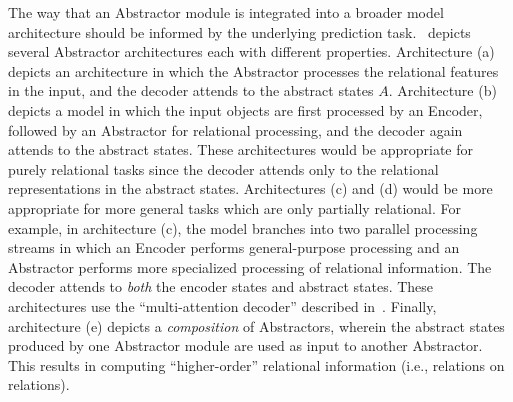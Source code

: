 The way that an Abstractor module is integrated into a broader model architecture should be informed by the underlying prediction task.~ depicts several Abstractor architectures each with different properties. Architecture (a) depicts an architecture in which the Abstractor processes the relational features in the input, and the decoder attends to the abstract states $A$. Architecture (b) depicts a model in which the input objects are first processed by an Encoder, followed by an Abstractor for relational processing, and the decoder again attends to the abstract states. These architectures would be appropriate for purely relational tasks since the decoder attends only to the relational representations in the abstract states. Architectures (c) and (d) would be more appropriate for more general tasks which are only partially relational. For example, in architecture (c), the model branches into two parallel processing streams in which an Encoder performs general-purpose processing and an Abstractor performs more specialized processing of relational information.
The decoder attends to \textit{both} the encoder states and abstract states.
These architectures use the ``multi-attention decoder'' described in~.
Finally, architecture (e) depicts a \textit{composition} of Abstractors, wherein the abstract states produced by one Abstractor module are used as input to another Abstractor. This results in computing ``higher-order'' relational information (i.e., relations on relations).
